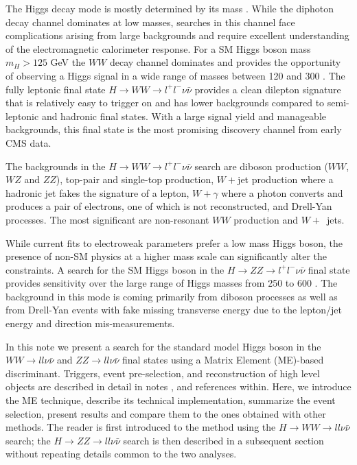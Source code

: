 The Higgs decay mode is mostly determined by its mass \cite{ref:Hdecay}. While the diphoton decay channel dominates at low masses, searches 
in this channel face complications arising from large backgrounds and require excellent understanding of the electromagnetic
calorimeter response. For a SM Higgs boson mass $m_{H}>125$ GeV the $WW$ decay channel dominates and provides the opportunity of observing a 
Higgs signal in a wide range of masses between 120 and 300 \GeVcc.  The fully leptonic final state $H \rightarrow WW 
\rightarrow l^{+}l^{-}\nu\bar{\nu}$ provides a clean dilepton signature that is relatively easy to trigger on and has lower backgrounds compared to
semi-leptonic and hadronic final states. With a large signal yield and manageable backgrounds, 
this final state is the most promising discovery channel from early CMS data. 

The backgrounds in the $H \rightarrow WW \rightarrow l^{+}l^{-}\nu\bar{\nu}$ search are diboson production ($WW$, $WZ$ and $ZZ$), top-pair and 
single-top production, $W+$jet production where a hadronic jet fakes the signature of a lepton, $W+\gamma$ where a photon 
converts and produces a pair of electrons, one of which is not reconstructed, and Drell-Yan processes.  The most significant are
non-resonant $WW$ production and $W+$~jets.

While current fits to electroweak parameters prefer a low mass Higgs boson, the presence of non-SM physics at a higher mass scale can significantly alter
 the constraints. A search for the SM Higgs boson in the $H \rightarrow ZZ \rightarrow l^{+}l^{-}\nu\bar{\nu}$ final state provides sensitivity over the large
range of Higgs masses from 250 to 600 \GeVcc. The background in this mode is coming primarily from diboson processes as well as from Drell-Yan events with fake missing transverse energy due to the lepton/jet energy and direction mis-measurements. 

In this note we present a search for the standard model Higgs boson in the $WW \rightarrow ll\nu\bar{\nu}$ and $ZZ \rightarrow ll\nu\bar{\nu}$ final states 
using a Matrix Element (ME)-based discriminant. Triggers, event pre-selection, and reconstruction of high level objects are described 
in detail in notes \cite{ref:HWW2011smurf}, \cite{ref:HZZ2011smurf} and references within. Here, we introduce the ME technique, 
describe its technical implementation, summarize the event selection, present results and compare them to the ones obtained with 
other methods. The reader is first introduced to the method using the $H\rightarrow WW \rightarrow ll\nu\bar{\nu}$ search; the
$H \rightarrow ZZ \rightarrow ll\nu\bar{\nu}$ search is then described in a subsequent section without repeating details common to the two analyses.
